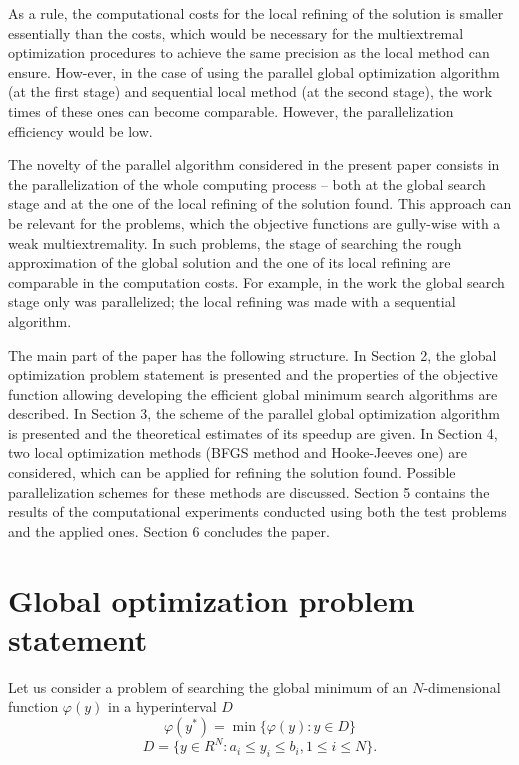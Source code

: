 \documentclass[runningheads]{llncs}
\begin{document}
As a rule, the computational costs for the local refining of the solution is smaller essentially than the costs, which would be necessary for the multiextremal optimization procedures to achieve the same precision as the local method can ensure. How-ever, in the case of using the parallel global optimization algorithm (at the first stage) and sequential local method (at the second stage), the work times of these ones can become comparable. However, the parallelization efficiency would be low.

The novelty of the parallel algorithm considered in the present paper consists in the parallelization of the whole computing process – both at the global search stage and at the one of the local refining of the solution found. This approach can be relevant for the problems, which the objective functions are gully-wise with a weak multiextremality. In such problems, the stage of searching the rough approximation of the global solution and the one of its local refining are comparable in the computation costs. For example, in the work \cite{Gubaydullin2021} the global search stage only was parallelized; the local refining was made with a sequential algorithm.

The main part of the paper has the following structure. In Section 2, the global optimization problem statement is presented and the properties of the objective function allowing developing the efficient global minimum search algorithms are described. In Section 3, the scheme of the parallel global optimization algorithm is presented and the theoretical estimates of its speedup are given. In Section 4, two local optimization methods (BFGS method and Hooke-Jeeves one) are considered, which can be applied for refining the solution found. Possible parallelization schemes for these methods are discussed. Section 5 contains the results of the computational experiments conducted using both the test problems and the applied ones. Section 6 concludes the paper.

\section{Global optimization problem statement}

Let us consider a problem of searching the global minimum of an $N$-dimensional function $\varphi(y)$ in a hyperinterval $D$
\begin{equation}\label{problemN}
\varphi(y^*) = \min{\{ \varphi(y):y \in D \}}
\end{equation}
\begin{equation}\label{D}
D = \{ y \in R^{N}: a_i \leq y_i \leq b_i, 1 \leq i \leq N \}.
\end{equation}
\end{document}
